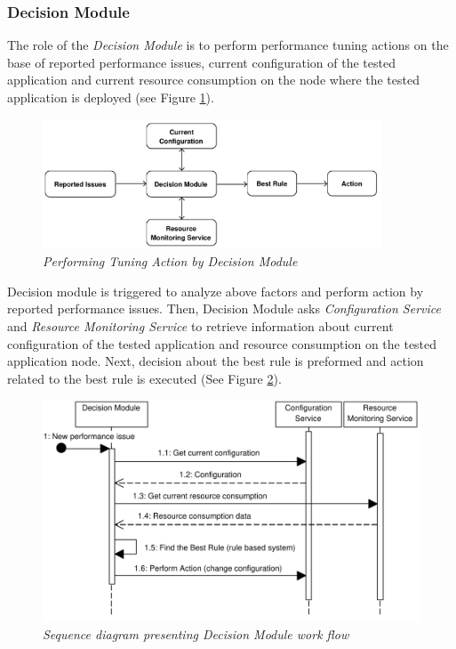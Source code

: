\documentclass[10pt,a4paper]{article}
\begin{document}
\subsubsection{Decision Module} \label{dm}

The role of the \textit{Decision Module} is to perform performance tuning actions on the base of reported performance issues, current configuration of the tested application and current resource consumption on the node where the tested application is deployed (see Figure \ref{decisionmodule}). 

\begin{figure}[!htb]
\centering
\includegraphics[width=0.9\textwidth]{DecisionModuleDiagram}
\caption{\textit{Performing Tuning Action by Decision Module}} \label{decisionmodule}
\end{figure}

Decision module is triggered to analyze above factors and perform action by reported performance issues. Then, Decision Module asks \textit{Configuration Service} and \textit{Resource Monitoring Service} to retrieve information about current configuration of the tested application and resource consumption on the tested application node. Next, decision about the best rule is preformed and action related to the best rule is executed (See Figure \ref{dmsequence}). 

\begin{figure}[!htb]
\centering
\includegraphics[width=1\textwidth]{DecisionModuleSequenceDiagram}
\caption{\textit{Sequence diagram presenting Decision Module work flow}} \label{dmsequence}
\end{figure}
\end{document}

